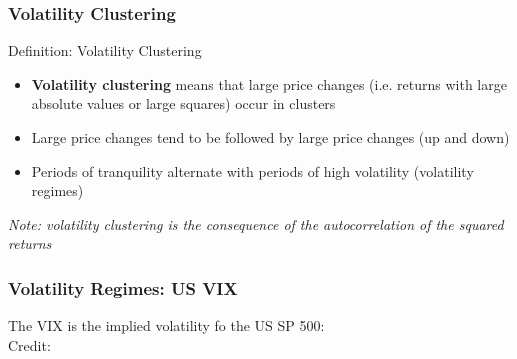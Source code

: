 \documentclass{beamer}
\begin{document}
\begin{frame}
  \frametitle{Volatility Clustering}
  \begin{block}{Definition: Volatility Clustering}
    \begin{itemize}
    \item \textbf{Volatility clustering} means that large price changes (i.e. returns with large absolute values or large squares) occur in clusters
    \item Large price changes tend to be followed by large price changes (up and down)
    \item Periods of tranquility alternate with periods of high volatility (volatility regimes)
    \end{itemize}
    
    \emph{Note: volatility clustering is the consequence of the autocorrelation of the squared returns}\\
    
  \end{block}
\end{frame}


\begin{frame}
  \frametitle{Volatility Regimes: US VIX}
  The VIX is the implied volatility fo the US SP 500:\\ 
  \hspace*{15pt}\hbox{\scriptsize Credit:} 
\end{frame}
\end{document}
